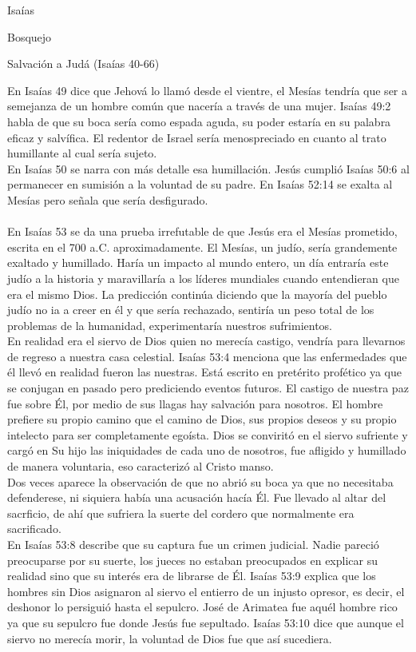 \begin{section}{Isaías}
\begin{subsection}{Bosquejo}
\begin{subsubsection}{Salvación a Judá (Isaías 40-66)}
\begin{itemize}
					En Isaías 49 dice que Jehová lo llamó desde el vientre, el Mesías tendría que ser a semejanza de un hombre común que nacería a través de una mujer. Isaías 49:2 habla de que su boca sería como espada aguda, su poder estaría en su palabra eficaz y salvífica. El redentor de Israel sería menospreciado en cuanto al trato humillante al cual sería sujeto.\\
					En Isaías 50 se narra con más detalle esa humillación. Jesús cumplió Isaías 50:6 al permanecer en sumisión a la voluntad de su padre. En Isaías 52:14 se exalta al Mesías pero señala que sería desfigurado.\\
					\\
					En Isaías 53 se da una prueba irrefutable de que Jesús era el Mesías prometido, escrita en el 700 a.C. aproximadamente. El Mesías, un judío, sería grandemente exaltado y humillado. Haría un impacto al mundo entero, un día entraría este judío a la historia y maravillaría a los líderes mundiales cuando entendieran que era el mismo Dios. La predicción continúa diciendo que la mayoría del pueblo judío no ia a creer en él y que sería rechazado, sentiría un peso total de los problemas de la humanidad, experimentaría nuestros sufrimientos.\\
					En realidad era el siervo de Dios quien no merecía castigo, vendría para llevarnos de regreso a nuestra casa celestial. Isaías 53:4 menciona que las enfermedades que él llevó en realidad fueron las nuestras. Está escrito en pretérito profético ya que se conjugan en pasado pero prediciendo eventos futuros. El castigo de nuestra paz fue sobre Él, por medio de sus llagas hay salvación para nosotros. El hombre prefiere su propio camino que el camino de Dios, sus propios deseos y su propio intelecto para ser completamente egoísta. Dios se conviritó en el siervo sufriente y cargó en Su hijo las iniquidades de cada uno de nosotros, fue afligido y humillado de manera voluntaria, eso caracterizó al Cristo manso. \\
					Dos veces aparece la observación de que no abrió su boca ya que no necesitaba defenderese, ni siquiera había una acusación hacía Él. Fue llevado al altar del sacrficio, de ahí que sufriera la suerte del cordero que normalmente era sacrificado.\\
					En Isaías 53:8 describe que su captura fue un crimen judicial.
					\newpage
					Nadie pareció preocuparse por su suerte, los jueces no estaban preocupados en explicar su realidad sino que su interés era de librarse de Él. Isaías 53:9 explica que los hombres sin Dios asignaron al siervo el entierro de un injusto opresor, es decir, el deshonor lo persiguió hasta el sepulcro. José de Arimatea fue aquél hombre rico ya que su sepulcro fue donde Jesús fue sepultado. Isaías 53:10 dice que aunque el siervo no merecía morir, la voluntad de Dios fue que así sucediera.\\

\end{itemize}
\end{subsubsection}
\end{subsection}
\end{section}
